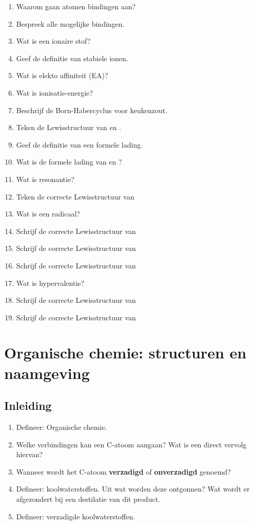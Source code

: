 \documentclass[a4paper,12pt]{article}
\begin{document}
    \begin{enumerate}
        \item Waarom gaan atomen bindingen aan?
        \item Bespreek alle mogelijke bindingen.
        \item Wat is een ionaire stof?
        \item Geef de definitie van stabiele ionen.
        \item Wat is elekto affiniteit (EA)?
        \item Wat is ionisatie-energie?
        \item Beschrijf de Born-Habercyclus voor keukenzout.
        \item Teken de Lewisstructuur van  en .
        \item Geef de definitie van een formele lading.
        \item Wat is de formele lading van  en ?
        \item Wat is resonantie?
        \item Teken de correcte Lewisstructuur van 
        \item Wat is een radicaal?
        \item Schrijf de correcte Lewisstructuur van 
        \item Schrijf de correcte Lewisstructuur van 
        \item Schrijf de correcte Lewisstructuur van 
        \item Wat is hypervalentie?
        \item Schrijf de correcte Lewisstructuur van 
        \item Schrijf de correcte Lewisstructuur van 
    \end{enumerate}

    \section{Organische chemie: structuren en naamgeving}
    \subsection*{Inleiding}
    \begin{enumerate}
        \item Defineer: Organische chemie.
        \item Welke verbindingen kan een C-atoom aangaan? Wat is een direct vervolg hiervan? 
        \item Wanneer wordt het C-atoom \textbf{verzadigd} of \textbf{onverzadigd} genoemd?
        \item Defineer: koolwaterstoffen. Uit wat worden deze ontgonnen? Wat wordt er afgezondert bij een destilatie van dit product.
        \item Defineer: verzadigde koolwaterstoffen.
    \end{enumerate}
\end{document}
